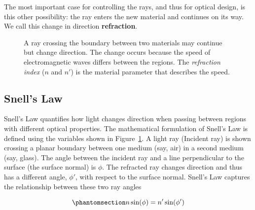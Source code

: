 \documentclass[
  letterpaper,
]{book}
\begin{document}
The most important case for controlling the rays, and thus for optical
design, is this other possibility: the ray enters the new material and
continues on its way. We call this change in direction
\textbf{refraction}.

\begin{figure}


\caption{\label{fig-snell-law}A ray crossing the boundary between two
materials may continue but change direction. The change occurs because
the speed of electromagnetic waves differs between the regions. The
\emph{refraction index} (\(n\) and \(n'\)) is the material parameter
that describes the speed.}

\end{figure}%

\subsection{Snell's Law}\label{sec-snells-law}

Snell's Law quantifies how light changes direction when passing between
regions with different optical properties. The mathematical formulation
of Snell's Law is defined using the variables shown in
Figure~\ref{fig-snell-law}. A light ray (Incident ray) is shown crossing
a planar boundary between one medium (say, air) in a second medium (say,
glass). The angle between the incident ray and a line perpendicular to
the surface (the surface normal) is \(\phi\). The refracted ray changes
direction and thus has a different angle, \(\phi '\), with respect to
the surface normal. Snell's Law captures the relationship between these
two ray angles

\begin{equation}\phantomsection\label{eq-snell}{ 
n \sin(\phi) = n' \sin(\phi') 
}\end{equation}
\end{document}
